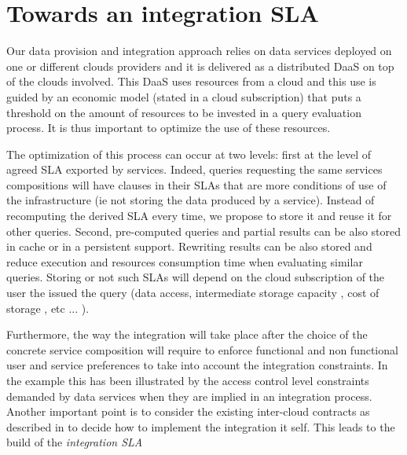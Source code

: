 \color{black}

 
\section{Towards an integration SLA}
\label{sec:queryProcessOpt}
 Our data provision and integration approach relies on data services deployed on one or different clouds providers and it is delivered as a distributed DaaS on top of the clouds involved.  This DaaS  uses resources from a cloud and this use  is  guided by an economic model (stated in a cloud subscription) that puts a threshold on the amount of resources to be invested in a query evaluation process. It is thus important to optimize the use of these resources. 
   
The optimization of this process can occur at two levels: first at the level of agreed SLA exported by services.  Indeed, queries requesting the same services compositions will have clauses in their SLAs that are more conditions of use of the infrastructure (ie not storing the data produced by a service). Instead of recomputing the derived SLA every time, we propose to store it and reuse it for other queries. 
Second, pre-computed queries and partial results can be also stored in cache or in a persistent support. Rewriting results can be also stored and reduce execution and resources consumption time when evaluating similar queries. Storing or not such SLAs will depend on the cloud subscription of the user the issued the query (data access, intermediate storage capacity , cost of storage , etc ... ).


Furthermore, the way the integration will take place after the choice of the concrete service composition will require to enforce functional and non functional user and service preferences to take into account the integration constraints. In the example this has been illustrated by  the access control level constraints demanded by data services when they are implied in an integration process. Another important point is to consider the existing inter-cloud contracts as described in \cite{} to decide how to implement the integration it self. This leads to the build of the \textit{integration SLA} 
 

%
 


